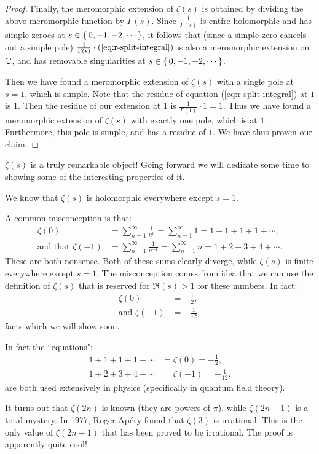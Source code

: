 \begin{proof}
Finally, the meromorphic extension of $\zeta(s)$ is obtained by dividing the above meromorphic function by $\Gamma(s)$. Since $\frac{1}{\Gamma(s)}$ is entire holomorphic and has simple zeroes at $s \in \set{0,-1,-2, \cdots}$, it follows that (since a simple zero cancels out a simple pole) $\frac{1}{\Gamma(s)} \cdot (\ref{eq:r-split-integral}) $ is also a meromorphic extension on $\mathbb{C}$, and has removable singularities at $s \in \set{0,-1,-2, \cdots}$.

Then we have found a meromorphic extension of $\zeta(s)$ with a single pole at $s = 1$, which is simple. Note that the residue of equation (\ref{eq:r-split-integral}) at $1$ is $1$. Then the residue of our extension at $1$ is $\frac{1}{\Gamma(1)} \cdot 1 = 1$. Thus we have found a meromorphic extension of $\zeta(s)$ with exactly one pole, which is at $1$. Furthermore, this pole is simple, and has a residue of $1$. We have thus proven our claim.

\end{proof}

$\zeta(s)$ is a truly remarkable object! Going forward we will dedicate some time to showing some of the interesting properties of it.

We know that $\zeta(s)$ is holomorphic everywhere except $s=1$.

\begin{remark}
A common misconception is that:
\begin{align*}
    \zeta(0) &= \sum_{n=1}^\infty \frac{1}{n^0} = \sum_{n=1}^\infty 1 = 1+1+1+1+\cdots,\\
    \text{and that }\zeta(-1) &= \sum_{n=1}^\infty \frac{1}{n^{-1}} = \sum_{n=1}^\infty n = 1+2+3+4+\cdots.
\end{align*}
These are both nonsense. Both of these sums clearly diverge, while $\zeta(s)$ is finite everywhere except $s=1$. The misconception comes from idea that we can use the definition of $\zeta(s)$ that is reserved for $\Re(s) > 1$ for these numbers. In fact:
\begin{align*}
    \zeta(0) &= -\frac{1}{2},\\
    \text{and } \zeta(-1) &= - \frac{1}{12},
\end{align*}
facts which we will show soon.

\end{remark}
\begin{note}
In fact the ``equations":
\begin{align*}
    1+1+1+1+\cdots &= \zeta(0) = -\frac{1}{2},\\
    1+2+3+4+\cdots &= \zeta(-1) = - \frac{1}{12}.
\end{align*}
are both used extensively in physics (specifically in quantum field theory).
\end{note}

\begin{remark}
It turns out that $\zeta(2n)$ is known (they are powers of $\pi$), while $\zeta(2n+1)$ is a total mystery. In 1977, Roger Apéry found that $\zeta(3)$ is irrational. This is the only value of $\zeta(2n+1)$ that has been proved to be irrational. The proof is apparently quite cool!
\end{remark}
